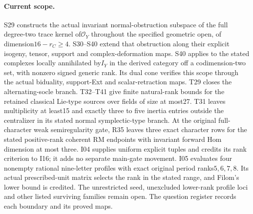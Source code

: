 \paragraph{Current scope.}
S29 constructs the actual invariant normal-obstruction subspace of
the full degree-two trace kernel of$\mathcal O_Y$ throughout the
specified geometric open, of dimension$16-r_C\ge4$.
S30--S40 extend that obstruction along their explicit isogeny,
tensor, support and complex-deformation maps. S40 applies to
the stated complexes locally annihilated by$I_Y$ in the derived
category off a codimension-two set, with nonzero signed generic
rank. Its dual cone verifies this scope through the actual
biduality, support-Ext and scalar-retraction maps.
T29 closes the alternating-socle branch. T32--T41 give finite
natural-rank bounds for the retained classical Lie-type sources
over fields of size at most27. T31 leaves multiplicity at least15
and exactly three to five inertia entries outside the centralizer
in its stated normal symplectic-type branch.
At the original full-character weak semiregularity gate, R35
leaves three exact character rows for the stated positive-rank
coherent RM endpoints with invariant forward Hom dimension at
most three. I04 supplies uniform explicit tuples and credits
its rank criterion to I16; it adds no separate main-gate movement.
I05 evaluates four nonempty rational nine-letter profiles with
exact original period ranks$5,6,7,8$. Its actual prescribed-unit
matrix selects the rank in the stated range, and Filom's lower
bound is credited. The unrestricted seed, unexcluded lower-rank
profile loci and other listed surviving families remain open.
The question register records each boundary and its proved maps.
